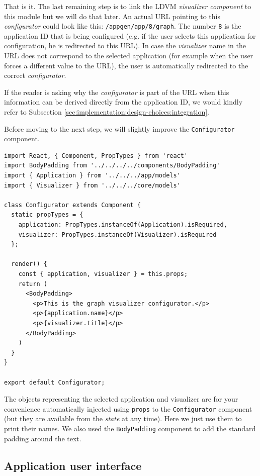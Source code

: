 That is it. The last remaining step is to link the LDVM \emph{visualizer component} to this module but we will do that later. An actual URL pointing to this \emph{configurator}  could look like this: \texttt{/appgen/app/8/graph}. The number \texttt{8} is the application ID that is being configured (e.g. if the user selects this application for configuration, he is redirected to this URL). In case the \emph{visualizer} name in the URL does not correspond to the selected application (for example when the user forces a different value to the URL), the user is automatically redirected to the correct \emph{configurator}.

If the reader is asking why the \emph{configurator} is part of the URL when this information can be derived directly from the application ID, we would kindly refer to Subsection \ref{sec:implementation:design-choices:integration}.

Before moving to the next step, we will slightly improve the \texttt{Configurator} component.

\begin{verbatim}
import React, { Component, PropTypes } from 'react'
import BodyPadding from '../../../../components/BodyPadding'
import { Application } from '../../../app/models'
import { Visualizer } from '../../../core/models'

class Configurator extends Component {
  static propTypes = {
    application: PropTypes.instanceOf(Application).isRequired,
    visualizer: PropTypes.instanceOf(Visualizer).isRequired
  };

  render() {
    const { application, visualizer } = this.props;
    return (
      <BodyPadding>
        <p>This is the graph visualizer configurator.</p>
        <p>{application.name}</p>
        <p>{visualizer.title}</p>
      </BodyPadding>
    )
  }
}

export default Configurator;
\end{verbatim}

The objects representing the selected application and visualizer are  for your convenience automatically injected using \texttt{props} to the \texttt{Configurator} component (but they are available from the \emph{state} at any time). Here we just use them to print their names. We also used the \texttt{BodyPadding} component to add the standard padding around the text.

\subsection{Application user interface}
\label{sec:implementation:integrating-visualizer:4}

